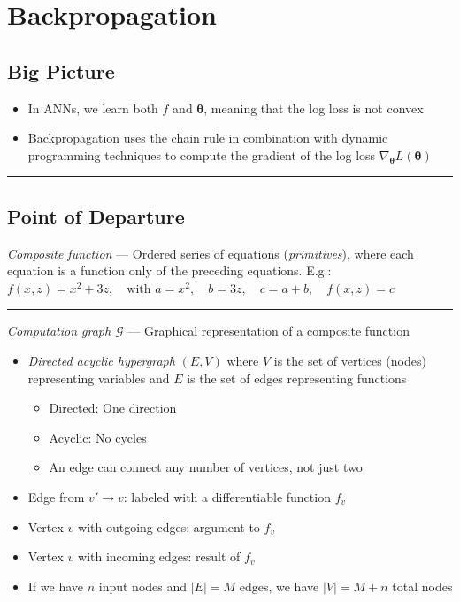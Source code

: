 \section{Backpropagation}
\subsection*{Big Picture}
\begin{itemize}
    \item In ANNs, we learn both $f$ and $\boldsymbol{\theta}$, meaning that the log loss is not convex
    \item Backpropagation uses the chain rule in combination with dynamic programming techniques to compute the gradient of the log loss $\nabla_{\boldsymbol{\theta}} L(\boldsymbol{\theta})$
\end{itemize}

{\color{black}\hrule height 0.001mm}

\subsection*{Point of Departure}

\emph{Composite function} --- Ordered series of equations (\emph{primitives}), where each equation is a function only of the preceding equations. E.g.:
$
f(x, z) = x^2 + 3z, \quad \textrm{with }
a = x^2, \quad b = 3z, \quad c = a + b, \quad f(x, z) = c
$

{\color{lightgray}\hrule height 0.001mm}

\emph{Computation graph $\mathcal{G}$} --- Graphical representation of a composite function
\begin{itemize}
    \item \emph{Directed acyclic hypergraph} $(E, V)$ where $V$ is the set of vertices (nodes) representing variables and $E$ is the set of edges representing functions
    \begin{itemize}
        \item Directed: One direction
        \item Acyclic: No cycles
        \item An edge can connect any number of vertices, not just two
    \end{itemize}
    \item Edge from $v' \to v$: labeled with a differentiable function $f_v$
    \item Vertex $v$ with outgoing edges: argument to $f_v$
    \item Vertex $v$ with incoming edges: result of $f_v$
    \item If we have $n$ input nodes and $|E| = M$ edges, we have $|V| = M + n$ total nodes
\end{itemize}


